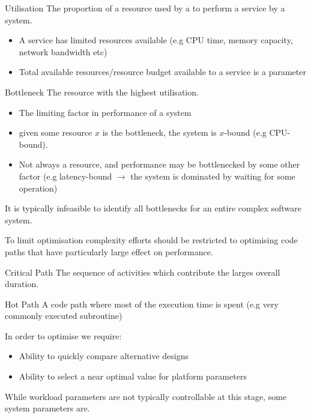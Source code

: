 \begin{tcbraster}[raster columns=2,raster equal height]
\begin{definitionbox}{Utilisation}
    The proportion of a resource used by a to perform a service by a system.
    \begin{itemize}
        \item A service has limited resources available (e.g CPU time, memory capacity, network bandwidth etc)
        \item Total available resources/resource budget available to a service is a parameter
    \end{itemize}
\end{definitionbox}
\begin{definitionbox}{Bottleneck}
    The resource with the highest utilisation.
    \begin{itemize}
        \item The limiting factor in performance of a system
        \item given some resource $x$ is the bottleneck, the system is $x$-bound (e.g CPU-bound). 
        \item Not always a resource, and performance may be bottlenecked by some other factor (e.g latency-bound $\to$ the system is dominated by waiting for some operation)
    \end{itemize}
\end{definitionbox}
\end{tcbraster}
It is typically infeasible to identify all bottlenecks for an entire complex software system.

To limit optimisation complexity efforts should be restricted to optimising code paths that have particularly large effect on performance.
\begin{tcbraster}[raster columns=2,raster equal height]
    \begin{definitionbox}{Critical Path}
        The sequence of activities which contribute the larges overall duration.
    \end{definitionbox}
    \begin{definitionbox}{Hot Path}
        A code path where most of the execution time is spent (e.g very commonly executed subroutine)
    \end{definitionbox}
\end{tcbraster}

In order to optimise we require:
\begin{itemize}
    \item Ability to quickly compare alternative designs
    \item Ability to select a near optimal value for platform parameters
\end{itemize}
While workload parameters are not typically controllable at this stage, some system parameters are.


